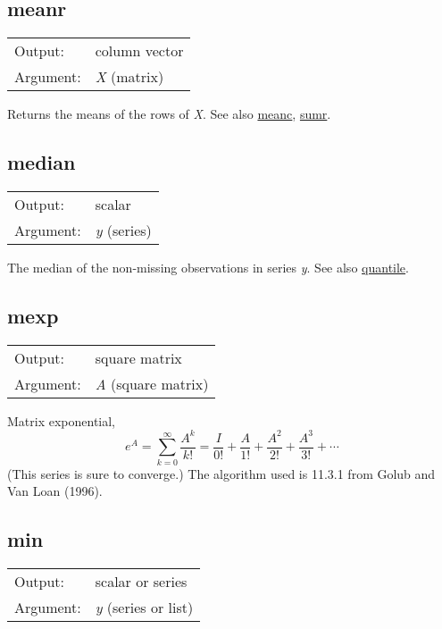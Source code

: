 \subsection{meanr}
\hypertarget{func-meanr}{}

\begin{tabular}{ll}
Output:     & column vector\\
Argument:   & \textsl{X} (matrix)\\
\end{tabular}

	  Returns the means of the rows of \textsl{X}. 
	  See also \hyperlink{func-meanc}{meanc}, \hyperlink{func-sumr}{sumr}.

\subsection{median}
\hypertarget{func-median}{}

\begin{tabular}{ll}
Output:     & scalar\\
Argument:   & \textsl{y} (series)\\
\end{tabular}

	  The median of the non-missing observations in series
	  \textsl{y}. 
	  See also \hyperlink{func-quantile}{quantile}.

\subsection{mexp}
\hypertarget{func-mexp}{}

\begin{tabular}{ll}
Output:     & square matrix\\
Argument:   & \textsl{A} (square matrix)\\
\end{tabular}

	  Matrix exponential, 
	  \[ e^A = \sum_{k=0}^{\infty} \frac{A^k}{k!}
	  = \frac{I}{0!} + \frac{A}{1!} + \frac{A^2}{2!} + \frac{A^3}{3!}
	  + \cdots\] 
	  (This series is sure to converge.) The algorithm used
	  is 11.3.1 from Golub and Van Loan (1996).

\subsection{min}
\hypertarget{func-min}{}

\begin{tabular}{ll}
Output:     & scalar or series\\
Argument:   & \textsl{y} (series or list)\\
\end{tabular}

